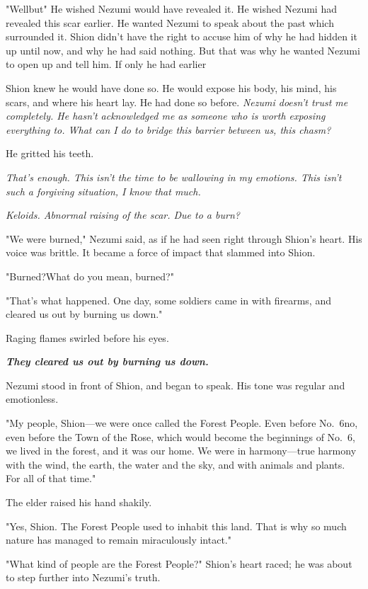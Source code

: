 "Well\el but\el " He wished Nezumi would have revealed it. He wished
Nezumi had revealed this scar earlier. He wanted Nezumi to speak about
the past which surrounded it. Shion didn't have the right to accuse him
of why he had hidden it up until now, and why he had said nothing. But
that was why he wanted Nezumi to open up and tell him. If only he had
earlier\el 

Shion knew he would have done so. He would expose his body, his mind,
his scars, and where his heart lay. He had done so before. \emph{Nezumi
doesn't trust me completely. He hasn't acknowledged me as someone who is
worth exposing everything to. What can I do to bridge this barrier
between us, this chasm?}

He gritted his teeth.

\emph{That's enough. This isn't the time to be wallowing in my emotions. This
isn't such a forgiving situation, I know that much.}

\emph{Keloids. Abnormal raising of the scar. Due to a burn?}

"We were burned," Nezumi said, as if he had seen right through Shion's
heart. His voice was brittle. It became a force of impact that slammed
into Shion.

"Burned?\el What do you mean, burned?"

"That's what happened. One day, some soldiers came in with firearms, and
cleared us out by burning us down."

Raging flames swirled before his eyes.

\emph{\textbf{They cleared us out by burning us down.}}

Nezumi stood in front of Shion, and began to speak. His tone was regular
and emotionless.

"My people, Shion---we were once called the Forest People. Even before
No.~6\el no, even before the Town of the Rose, which would become the
beginnings of No.~6, we lived in the forest, and it was our home. We
were in harmony---true harmony with the wind, the earth, the water and the
sky, and with animals and plants. For all of that time."

The elder raised his hand shakily.

"Yes, Shion. The Forest People used to inhabit this land. That is why so
much nature has managed to remain miraculously intact."

"What kind of people are the Forest People?" Shion's heart raced; he was
about to step further into Nezumi's truth.

